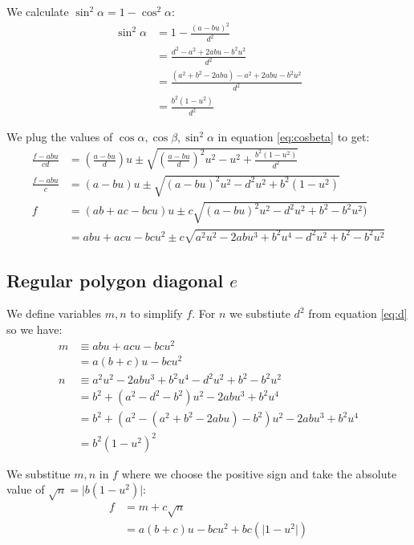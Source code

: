 \documentclass[11pt]{article}
\begin{document}
We calculate $\sin^2\alpha = 1 - \cos^2\alpha$:
\begin{align}
\sin^2\alpha &= 1 - \frac{(a - bu)^2}{d^2}\nonumber\\
 &=\frac{d^2 - a^2 + 2abu - b^2u^2}{d^2}\nonumber\\
 &=\frac{(a^2 + b^2 - 2abu) - a^2 + 2abu - b^2u^2}{d^2}\nonumber\\
 &=\frac{b^2(1-u^2)}{d^2}
\end{align}

We plug the values of $\cos\alpha, \cos\beta, \sin^2\alpha$ in equation \ref{eq:cosbeta} to get:
\begin{align}
\frac{f - abu}{cd} &= \left(\frac{a - bu}{d}\right)u \pm \sqrt{
 \left(\frac{a - bu}{d}\right)^2u^2 - u^2 + \frac{b^2(1-u^2)}{d^2}
}\nonumber\\
\frac{f - abu}{c} &= (a - bu)u \pm \sqrt{(a-bu)^2u^2 - d^2u^2 + b^2(1-u^2)}\nonumber\\
f &= (ab + ac - bcu)u \pm c\sqrt{(a-bu)^2u^2 - d^2u^2 + b^2 - b^2u^2)}\nonumber\\
 &= abu + acu - bcu^2 \pm c\sqrt{a^2u^2 - 2abu^3 + b^2u^4- d^2u^2 + b^2 - b^2u^2 }
\end{align}

\subsection{Regular polygon diagonal $e$}

We define variables $m,n$ to simplify $f$. 
For $n$ we substiute $d^2$ from equation \ref{eq:d} so we have:
\begin{align}
m &\equiv abu + acu - bcu^2 \nonumber\\
 &= a(b+c)u - bcu^2 \label{eq:m}\\
n &\equiv a^2u^2 - 2abu^3 + b^2u^4- d^2u^2 + b^2 - b^2u^2\nonumber\\
 &= b^2 + (a^2 - d^2 - b^2)u^2 - 2abu^3 + b^2u^4\nonumber\\
 &= b^2 + (a^2 - (a^2 + b^2 - 2abu) - b^2)u^2 - 2abu^3 + b^2u^4\nonumber\\
 &= b^2(1 -u^2)^2 \label{eq:n}
\end{align}
 
We substitue $m,n$ in $f$ where we choose the positive sign and take the absolute
value of $\sqrt{n} = \lvert b(1-u^2) \rvert$: 
\begin{align}
f &= m + c\sqrt{n}\nonumber\\
 &= a(b+c)u - bcu^2 + bc(\lvert 1-u^2 \rvert) \label{eq:f}
\end{align}
\end{document}
